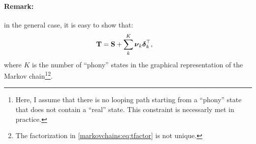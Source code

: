 \paragraph{Remark:} in the general case, it is easy to show that:
\begin{align}
    \boldsymbol{\mathbf{T}} &= \boldsymbol{\mathbf{S}} + \sum_{k}^K \boldsymbol{\mathbf{\nu}}_k \boldsymbol{\mathbf{\delta}}_k^\top,
    \label{markovchains:eq:tfactor}
\end{align}
where $K$ is the number of ``phony'' states in the graphical representation
of the Markov chain\footnote{
    Here, I assume that there is no looping path starting from a ``phony''
    state that does not contain a ``real'' state. This constraint
    is necessarly met in practice.
}\footnote{
    The factorization in \eqref{markovchains:eq:tfactor} is not unique.
}.

